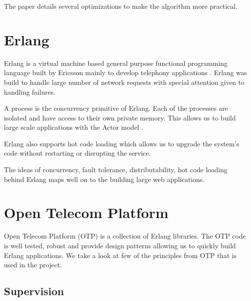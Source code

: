 The paper details several optimizations to make the algorithm more practical.

\section{Erlang}

Erlang \citep{erlang} is a virtual machine based general purpose functional
programming language built by Ericsson mainly to develop telephony applications
\citep{Armstrong07}. Erlang was build to handle large number of network
requests with special attention given to handling failures.

A process is the concurrency primitive of Erlang. Each of the processes are
isolated and have access to their own private memory. This allows us to build
large scale applications with the Actor model%
\citep{Clinger81}.

Erlang also supports hot code loading%
which allows us to upgrade the system's
code without restarting or disrupting the service.

The ideas of concurrency, fault tolerance, distributability, hot code loading
behind Erlang maps well on to the building large web applications.



\section{Open Telecom Platform}
\label{section:concepts.otp}

Open Telecom Platform (OTP) is a collection of Erlang libraries. The OTP code is
well tested, robust and provide design patterns allowing us to quickly build
Erlang applications. We take a look at few of the principles from OTP that is
used in the project.

\subsection{Supervision}
\label{section:concepts.supervision}

